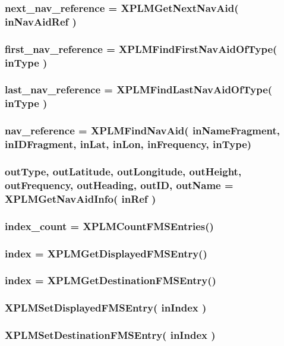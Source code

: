 \documentclass[11pt,parskip=half,a4paper]{scrartcl}
\begin{document}
\subsubsection{next\_nav\_reference = XPLMGetNextNavAid( inNavAidRef )}

\subsubsection{first\_nav\_reference = XPLMFindFirstNavAidOfType( inType )}

\subsubsection{last\_nav\_reference = XPLMFindLastNavAidOfType( inType )}

\subsubsection{nav\_reference = XPLMFindNavAid(  inNameFragment, inIDFragment, inLat, inLon, inFrequency, inType)}

\subsubsection{outType, outLatitude, outLongitude, outHeight, outFrequency, outHeading, outID,   outName = XPLMGetNavAidInfo( inRef )}

\subsubsection{index\_count = XPLMCountFMSEntries()}

\subsubsection{index = XPLMGetDisplayedFMSEntry()}

\subsubsection{index = XPLMGetDestinationFMSEntry()}

\subsubsection{XPLMSetDisplayedFMSEntry( inIndex )}

\subsubsection{XPLMSetDestinationFMSEntry( inIndex )}
\end{document}
